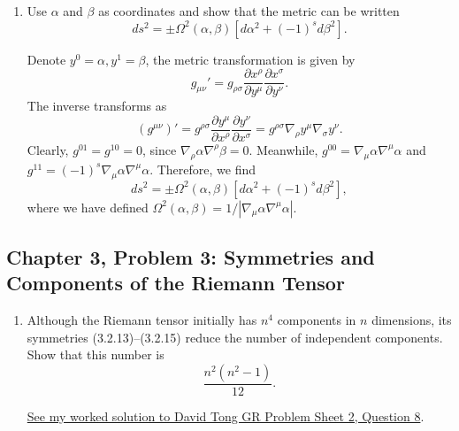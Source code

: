 \begin{enumerate}[label=\alph*)]
\begin{solution}
    \end{solution}

    \item Use $\alpha$ and $\beta$ as coordinates and show that the metric can be
    written
    \begin{equation}
        ds^2
        =\pm\Omega^2(\alpha,\beta)
        \left[d\alpha^2+(-1)^s d\beta^2\right].
    \end{equation}
    \begin{solution}
        Denote $y^0 = \alpha, y^1 = \beta$, the metric transformation is given by
        \begin{equation}
            g_{\mu\nu}' = g_{\rho\sigma}\frac{\partial x^\rho}{\partial y^\mu}\frac{\partial x^\sigma}{\partial y^\nu}.
        \end{equation}
        The inverse transforms as
        \begin{equation}
            (g^{\mu\nu})' = g^{\rho\sigma}\frac{\partial y^\mu}{\partial x^\rho}\frac{\partial y^\nu}{\partial x^\sigma} = g^{\rho\sigma}\nabla_\rho y^\mu \nabla_\sigma y^\nu.
        \end{equation}
        Clearly, $g^{01} = g^{10} = 0$, since $\nabla_\rho \alpha \nabla^\rho\beta = 0$. Meanwhile, $g^{00} = \nabla_\mu\alpha \nabla^\mu \alpha$ and $g^{11} = (-1)^s \nabla_\mu\alpha \nabla^\mu \alpha$. Therefore, we find
        \begin{equation}
            ds^2
        =\pm\Omega^2(\alpha,\beta)
        \left[d\alpha^2+(-1)^s d\beta^2\right],
        \end{equation}
        where we have defined $\Omega^2(\alpha,\beta) = 1/|\nabla_\mu\alpha \nabla^\mu \alpha|$.
    \end{solution}
\end{enumerate}

\subsection{Chapter 3, Problem 3: Symmetries and Components of the Riemann Tensor}

\begin{enumerate}[label=\alph*)]
    \item Although the Riemann tensor initially has $n^4$ components in $n$
    dimensions, its symmetries (3.2.13)--(3.2.15) reduce the number of independent
    components. Show that this number is
    \begin{equation}
        \frac{n^2(n^2-1)}{12}.
    \end{equation}
    \begin{solution}
\href{https://luca-yucheng-jin.github.io/luca-physics-site/notes/tong-gr-ps2.html#independent-components-of-the-riemann-tensor-q8}{See my worked solution to David Tong GR Problem Sheet 2, Question 8}.
\end{solution}
\end{enumerate}

